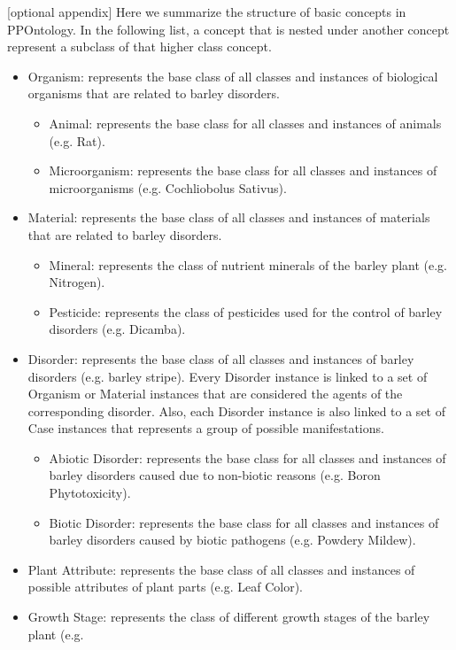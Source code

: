 \documentclass{frontiersSCNS} %
\begin{document}
[optional appendix]
Here we summarize the structure of basic concepts in PPOntology. In the following list, a concept that is nested under another concept represent a subclass of that higher class concept.

\begin{itemize}
\item Organism: represents the base class of all classes and instances of biological organisms that
are related to barley disorders.
	\begin{itemize}
	\item Animal: represents the base class for all classes and instances of animals (e.g. Rat).
	\item Microorganism: represents the base class for all classes and instances of microorganisms (e.g. Cochliobolus Sativus).
	\end{itemize}
\item Material: represents the base class of all classes and instances of materials that are related to
barley disorders.
	\begin{itemize}
	\item Mineral: represents the class of nutrient minerals of the barley plant (e.g. Nitrogen).
	\item Pesticide: represents the class of pesticides used for the control of barley disorders (e.g. Dicamba).
	\end{itemize}
\item Disorder: represents the base class of all classes and instances of barley disorders (e.g.
barley stripe). Every Disorder instance is linked to a set of Organism or Material instances
that are considered the agents of the corresponding disorder. Also, each Disorder instance is
also linked to a set of Case instances that represents a group of possible manifestations.
	\begin{itemize}
	\item Abiotic Disorder: represents the base class for all classes and instances of barley disorders caused due to non-biotic reasons (e.g. Boron Phytotoxicity).
	\item Biotic Disorder: represents the base class for all classes and instances of barley disorders caused by biotic pathogens (e.g. Powdery Mildew).
	\end{itemize}
\item Plant Attribute: represents the base class of all classes and instances of possible attributes of
plant parts (e.g. Leaf Color).
\item Growth Stage: represents the class of different growth stages of the barley plant (e.g.

\end{itemize}
\end{document}
